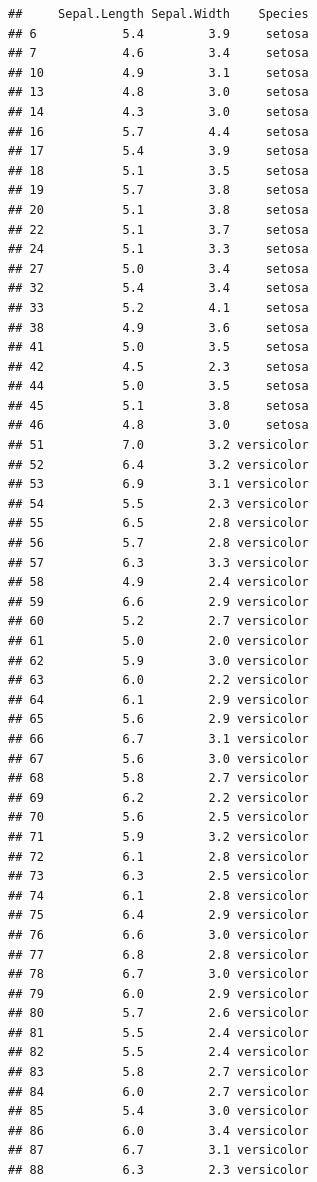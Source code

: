 \documentclass[11pt,]{book}
\begin{document}
\begin{verbatim}
##     Sepal.Length Sepal.Width    Species
## 6            5.4         3.9     setosa
## 7            4.6         3.4     setosa
## 10           4.9         3.1     setosa
## 13           4.8         3.0     setosa
## 14           4.3         3.0     setosa
## 16           5.7         4.4     setosa
## 17           5.4         3.9     setosa
## 18           5.1         3.5     setosa
## 19           5.7         3.8     setosa
## 20           5.1         3.8     setosa
## 22           5.1         3.7     setosa
## 24           5.1         3.3     setosa
## 27           5.0         3.4     setosa
## 32           5.4         3.4     setosa
## 33           5.2         4.1     setosa
## 38           4.9         3.6     setosa
## 41           5.0         3.5     setosa
## 42           4.5         2.3     setosa
## 44           5.0         3.5     setosa
## 45           5.1         3.8     setosa
## 46           4.8         3.0     setosa
## 51           7.0         3.2 versicolor
## 52           6.4         3.2 versicolor
## 53           6.9         3.1 versicolor
## 54           5.5         2.3 versicolor
## 55           6.5         2.8 versicolor
## 56           5.7         2.8 versicolor
## 57           6.3         3.3 versicolor
## 58           4.9         2.4 versicolor
## 59           6.6         2.9 versicolor
## 60           5.2         2.7 versicolor
## 61           5.0         2.0 versicolor
## 62           5.9         3.0 versicolor
## 63           6.0         2.2 versicolor
## 64           6.1         2.9 versicolor
## 65           5.6         2.9 versicolor
## 66           6.7         3.1 versicolor
## 67           5.6         3.0 versicolor
## 68           5.8         2.7 versicolor
## 69           6.2         2.2 versicolor
## 70           5.6         2.5 versicolor
## 71           5.9         3.2 versicolor
## 72           6.1         2.8 versicolor
## 73           6.3         2.5 versicolor
## 74           6.1         2.8 versicolor
## 75           6.4         2.9 versicolor
## 76           6.6         3.0 versicolor
## 77           6.8         2.8 versicolor
## 78           6.7         3.0 versicolor
## 79           6.0         2.9 versicolor
## 80           5.7         2.6 versicolor
## 81           5.5         2.4 versicolor
## 82           5.5         2.4 versicolor
## 83           5.8         2.7 versicolor
## 84           6.0         2.7 versicolor
## 85           5.4         3.0 versicolor
## 86           6.0         3.4 versicolor
## 87           6.7         3.1 versicolor
## 88           6.3         2.3 versicolor

\end{verbatim}
\end{document}
